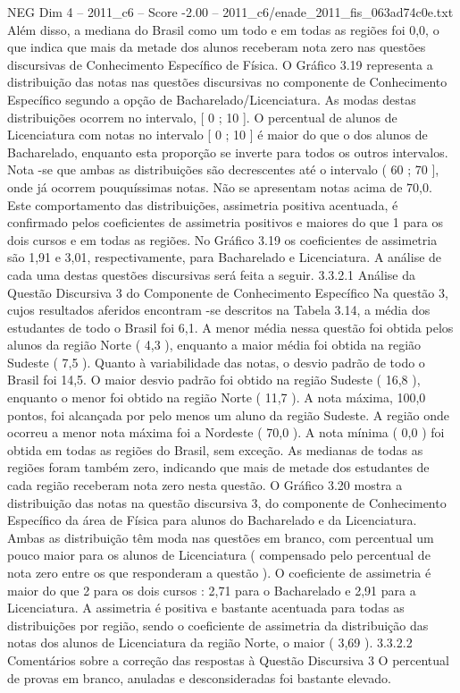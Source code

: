 \begin{textsample}{NEG Dim 4 – 2011\_c6 – Score -2.00 – 2011\_c6/enade\_2011\_fis\_063ad74c0e.txt}
Além disso, a mediana do Brasil como um todo e em todas as regiões foi 0,0, o que indica que mais da metade dos alunos receberam nota zero nas questões discursivas de Conhecimento Específico de Física.
O Gráfico 3.19 representa a distribuição das notas nas questões discursivas no componente de Conhecimento Específico segundo a opção de Bacharelado/Licenciatura.
As modas destas distribuições ocorrem no intervalo, [ 0 ; 10 ].
O percentual de alunos de Licenciatura com notas no intervalo [ 0 ; 10 ] é maior do que o dos alunos de Bacharelado, enquanto esta proporção se inverte para todos os outros intervalos.
Nota -se que ambas as distribuições são decrescentes até o intervalo ( 60 ; 70 ], onde já ocorrem pouquíssimas notas.
Não se apresentam notas acima de 70,0.
Este comportamento das distribuições, assimetria positiva acentuada, é confirmado pelos coeficientes de assimetria positivos e maiores do que 1 para os dois cursos e em todas as regiões.
No Gráfico 3.19 os coeficientes de assimetria são 1,91 e 3,01, respectivamente, para Bacharelado e Licenciatura.
A análise de cada uma destas questões discursivas será feita a seguir. 3.3.2.1 Análise da Questão Discursiva 3 do Componente de Conhecimento Específico Na questão 3, cujos resultados aferidos encontram -se descritos na Tabela 3.14, a média dos estudantes de todo o Brasil foi 6,1.
A menor média nessa questão foi obtida pelos alunos da região Norte ( 4,3 ), enquanto a maior média foi obtida na região Sudeste ( 7,5 ).
Quanto à variabilidade das notas, o desvio padrão de todo o Brasil foi 14,5.
O maior desvio padrão foi obtido na região Sudeste ( 16,8 ), enquanto o menor foi obtido na região Norte ( 11,7 ).
A nota máxima, 100,0 pontos, foi alcançada por pelo menos um aluno da região Sudeste.
A região onde ocorreu a menor nota máxima foi a Nordeste ( 70,0 ).
A nota mínima ( 0,0 ) foi obtida em todas as regiões do Brasil, sem exceção.
As medianas de todas as regiões foram também zero, indicando que mais de metade dos estudantes de cada região receberam nota zero nesta questão.
O Gráfico 3.20 mostra a distribuição das notas na questão discursiva 3, do componente de Conhecimento Específico da área de Física para alunos do Bacharelado e da Licenciatura.
Ambas as distribuição têm moda nas questões em branco, com percentual um pouco maior para os alunos de Licenciatura ( compensado pelo percentual de nota zero entre os que responderam a questão ).
O coeficiente de assimetria é maior do que 2 para os dois cursos : 2,71 para o Bacharelado e 2,91 para a Licenciatura.
A assimetria é positiva e bastante acentuada para todas as distribuições por região, sendo o coeficiente de assimetria da distribuição das notas dos alunos de Licenciatura da região Norte, o maior ( 3,69 ). 3.3.2.2 Comentários sobre a correção das respostas à Questão Discursiva 3 O percentual de provas em branco, anuladas e desconsideradas foi bastante elevado.

\end{textsample}

